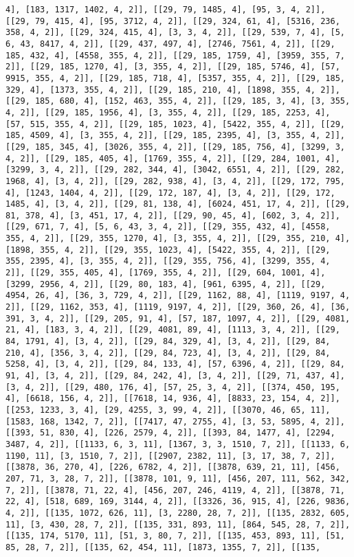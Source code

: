 \documentclass[12pt,fleqn]{article}\usepackage{../../common}
\begin{document}
\begin{verbatim}
4], [183, 1317, 1402, 4, 2]], [[29, 79, 1485, 4], [95, 3, 4, 2]], [[29, 79, 415, 4], [95, 3712, 4, 2]], [[29, 324, 61, 4], [5316, 236, 358, 4, 2]], [[29, 324, 415, 4], [3, 3, 4, 2]], [[29, 539, 7, 4], [5, 6, 43, 8417, 4, 2]], [[29, 437, 497, 4], [2746, 7561, 4, 2]], [[29, 185, 432, 4], [4558, 355, 4, 2]], [[29, 185, 1759, 4], [3959, 355, 7, 2]], [[29, 185, 1270, 4], [3, 355, 4, 2]], [[29, 185, 5746, 4], [57, 9915, 355, 4, 2]], [[29, 185, 718, 4], [5357, 355, 4, 2]], [[29, 185, 329, 4], [1373, 355, 4, 2]], [[29, 185, 210, 4], [1898, 355, 4, 2]], [[29, 185, 680, 4], [152, 463, 355, 4, 2]], [[29, 185, 3, 4], [3, 355, 4, 2]], [[29, 185, 1956, 4], [3, 355, 4, 2]], [[29, 185, 2253, 4], [57, 515, 355, 4, 2]], [[29, 185, 1023, 4], [5422, 355, 4, 2]], [[29, 185, 4509, 4], [3, 355, 4, 2]], [[29, 185, 2395, 4], [3, 355, 4, 2]], [[29, 185, 345, 4], [3026, 355, 4, 2]], [[29, 185, 756, 4], [3299, 3, 4, 2]], [[29, 185, 405, 4], [1769, 355, 4, 2]], [[29, 284, 1001, 4], [3299, 3, 4, 2]], [[29, 282, 344, 4], [3042, 6551, 4, 2]], [[29, 282, 1968, 4], [3, 4, 2]], [[29, 282, 938, 4], [3, 4, 2]], [[29, 172, 795, 4], [1243, 1404, 4, 2]], [[29, 172, 187, 4], [3, 4, 2]], [[29, 172, 1485, 4], [3, 4, 2]], [[29, 81, 138, 4], [6024, 451, 17, 4, 2]], [[29, 81, 378, 4], [3, 451, 17, 4, 2]], [[29, 90, 45, 4], [602, 3, 4, 2]], [[29, 671, 7, 4], [5, 6, 43, 3, 4, 2]], [[29, 355, 432, 4], [4558, 355, 4, 2]], [[29, 355, 1270, 4], [3, 355, 4, 2]], [[29, 355, 210, 4], [1898, 355, 4, 2]], [[29, 355, 1023, 4], [5422, 355, 4, 2]], [[29, 355, 2395, 4], [3, 355, 4, 2]], [[29, 355, 756, 4], [3299, 355, 4, 2]], [[29, 355, 405, 4], [1769, 355, 4, 2]], [[29, 604, 1001, 4], [3299, 2956, 4, 2]], [[29, 80, 183, 4], [961, 6395, 4, 2]], [[29, 4954, 26, 4], [36, 3, 729, 4, 2]], [[29, 1162, 88, 4], [1119, 9197, 4, 2]], [[29, 1162, 353, 4], [1119, 9197, 4, 2]], [[29, 360, 26, 4], [36, 391, 3, 4, 2]], [[29, 205, 91, 4], [57, 187, 1097, 4, 2]], [[29, 4081, 21, 4], [183, 3, 4, 2]], [[29, 4081, 89, 4], [1113, 3, 4, 2]], [[29, 84, 1791, 4], [3, 4, 2]], [[29, 84, 329, 4], [3, 4, 2]], [[29, 84, 210, 4], [356, 3, 4, 2]], [[29, 84, 723, 4], [3, 4, 2]], [[29, 84, 5258, 4], [3, 4, 2]], [[29, 84, 133, 4], [57, 6396, 4, 2]], [[29, 84, 91, 4], [3, 4, 2]], [[29, 84, 242, 4], [3, 4, 2]], [[29, 71, 437, 4], [3, 4, 2]], [[29, 480, 176, 4], [57, 25, 3, 4, 2]], [[374, 450, 195, 4], [6618, 156, 4, 2]], [[7618, 14, 936, 4], [8833, 23, 154, 4, 2]], [[253, 1233, 3, 4], [29, 4255, 3, 99, 4, 2]], [[3070, 46, 65, 11], [1583, 168, 1342, 7, 2]], [[7417, 47, 2755, 4], [3, 53, 5895, 4, 2]], [[393, 51, 830, 4], [226, 2579, 4, 2]], [[393, 84, 1477, 4], [2294, 3487, 4, 2]], [[1133, 6, 3, 11], [1367, 3, 3, 1510, 7, 2]], [[1133, 6, 1190, 11], [3, 1510, 7, 2]], [[2907, 2382, 11], [3, 17, 38, 7, 2]], [[3878, 36, 270, 4], [226, 6782, 4, 2]], [[3878, 639, 21, 11], [456, 207, 71, 3, 28, 7, 2]], [[3878, 101, 9, 11], [456, 207, 111, 562, 342, 7, 2]], [[3878, 71, 22, 4], [456, 207, 246, 4119, 4, 2]], [[3878, 71, 22, 4], [518, 689, 169, 3144, 4, 2]], [[3326, 36, 915, 4], [226, 9836, 4, 2]], [[135, 1072, 626, 11], [3, 2280, 28, 7, 2]], [[135, 2832, 605, 11], [3, 430, 28, 7, 2]], [[135, 331, 893, 11], [864, 545, 28, 7, 2]], [[135, 174, 5170, 11], [51, 3, 80, 7, 2]], [[135, 453, 893, 11], [51, 85, 28, 7, 2]], [[135, 62, 454, 11], [1873, 1355, 7, 2]], [[135, 
\end{verbatim}
\end{document}
